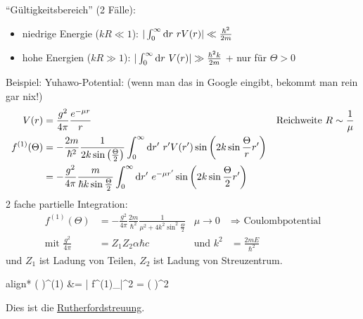 	``Gültigkeitsbereich'' (2 Fälle):
		\begin{itemize}
			\item niedrige Energie ($kR \ll 1$):
			$| \int_0^\infty \mathrm{d} r ~r V(r)|
			\ll \frac{\hbar^2}{2m}$
			\item hohe Energien ($kR \gg 1$):
			$ | \int_0^\infty \mathrm{d} r ~V(r)| 
			\gg \frac{\hbar^2 k}{2m}$ 
			+ nur für $\Theta > 0$
		\end{itemize}
	Beispiel: Yuhawo-Potential: (wenn man das in Google eingibt, bekommt man rein gar nix!)
		\begin{align*}
			V(r) &= \frac{g^2}{4 \pi} \frac{e^{-\mu r}}{r}
			& &\text{Reichweite } R \sim \frac{1}{\mu} \\
			f^{(1)} (\Theta) 
			&= - \frac{2m}{\hbar^2} \frac{1}{2 k \sin \left(\frac{\Theta}{2}\right)} 
			\int_0^\infty \mathrm{d} r' ~r' V(r')
			\sin \left(2 k \sin \frac{\Theta}{r} r'\right) \\
			&= - \frac{g^2}{4 \pi} \frac{m}{\hbar k \sin \frac{\Theta}{2}}
			\int_0^\infty \mathrm{d} r' ~e^{-\mu r'} 
			\sin \left(2 k \sin \frac{\Theta}{2} r' \right)
		\end{align*}
	2 fache partielle Integration:
		\begin{align*}
			f^{(1)}(\Theta) 
			&= - \frac{g^2}{4 \pi} \frac{2m}{\hbar^2}
			\frac{1}{\mu^2 +  4 k^2 \sin^2 \frac{\Theta}{2}}
			& \mu \rightarrow 0 
			&\Rightarrow \text{ Coulombpotential} \\
			\text{mit } \frac{g^2}{4 \pi} 
			&= Z_1 Z_2 \alpha \hbar c 
			& \text{und } k^2 &= \frac{2mE}{\hbar^2}
		\end{align*}
	und $Z_1$ ist Ladung von Teilen, $Z_2$ ist Ladung von Streuzentrum.
		\begin{empheq}[box=\boxed]{align*}
			\left( \frac{\diff \sigma}{\diff \Omega} \right)^{(1)} 
			&= | f^{(1)}_{}|^2
			= \left(
			\right)^2
		\end{empheq}
	Dies ist die \underline{Rutherfordstreuung}.
	

